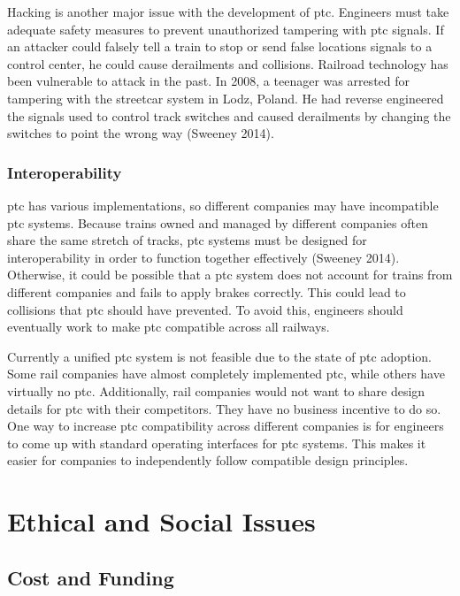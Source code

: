 \documentclass[11pt, titlepage]{article}
\begin{document}
Hacking is another major issue with the development of \gls{ptc}. Engineers must
take adequate safety measures to prevent unauthorized tampering with \gls{ptc}
signals. If an attacker could falsely tell a train to stop or send false locations
signals to a control center, he could cause derailments and collisions. Railroad
technology has been vulnerable to attack in the past. In 2008, a teenager was
arrested for tampering with the streetcar system in Lodz, Poland. He had reverse
engineered the signals used to control track switches and caused derailments by
changing the switches to point the wrong way (Sweeney 2014).

\subsubsection{Interoperability}

\gls{ptc} has various implementations, so different companies may have incompatible
\gls{ptc} systems. Because trains owned and managed by different companies often
share the same stretch of tracks, \gls{ptc} systems must be designed for
interoperability in order to function together effectively (Sweeney 2014).
Otherwise, it could be possible that a \gls{ptc} system does not account for trains
from different companies and fails to apply brakes correctly. This could lead to
collisions that \gls{ptc} should have prevented. To avoid this, engineers should
eventually work to make \gls{ptc} compatible across all railways.

Currently a unified \gls{ptc} system is not feasible due to the state of \gls{ptc}
adoption. Some rail companies have almost completely implemented \gls{ptc}, while
others have virtually no \gls{ptc}. Additionally, rail companies would not want to
share design details for \gls{ptc} with their competitors. They have no business
incentive to do so. One way to increase \gls{ptc} compatibility across different
companies is for engineers to come up with standard operating interfaces for
\gls{ptc} systems. This makes it easier for companies to independently follow
compatible design principles.

\pagebreak

\section{Ethical and Social Issues}

\subsection{Cost and Funding}
\end{document}
